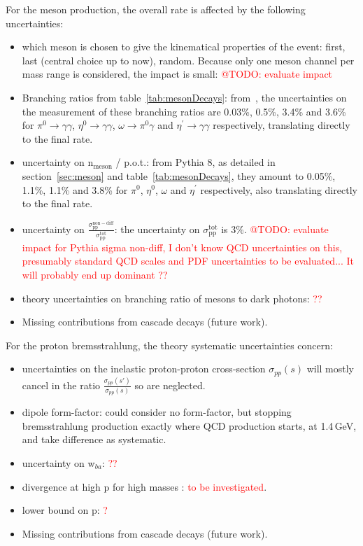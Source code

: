 \documentclass[12pt,a4paper]{article}
\begin{document}
For the meson production, the overall rate is affected by the
following uncertainties:
\begin{itemize}
\item which meson is chosen to give the kinematical properties of the
  event: first, last (central choice up to now), random. Because only
  one meson channel per mass range is considered, the impact is small:
  \textcolor{red}{@TODO: evaluate impact}
\item Branching ratios from table~\ref{tab:mesonDecays}:
  from~\cite{Patrignani:2016xqp}, the uncertainties on the measurement
  of these branching ratios are 0.03\%, 0.5\%, 3.4\% and 3.6\% for
  $\pi^0\rightarrow\gamma\gamma$, $\eta^0\rightarrow \gamma\gamma$,
  $\omega\rightarrow \pi^{0}\gamma$ and $\eta^{\prime}\rightarrow
  \gamma\gamma$ respectively, translating directly to the final rate.
\item uncertainty on n$_{\mathrm{meson}}$ / p.o.t.: from Pythia 8, as
  detailed in section~\ref{sec:meson} and table~\ref{tab:mesonDecays},
  they amount to 0.05\%, 1.1\%, 1.1\% and 3.8\% for $\pi^0$, $\eta^0$,
  $\omega$ and $\eta^{\prime}$ respectively, also translating directly
  to the final rate.
\item uncertainty on
  $\frac{\sigma_{\mathrm{pp}}^{\mathrm{non-diff}}}{\sigma_{\mathrm{pp}}^{\mathrm{tot}}}$:
  the uncertainty on $\sigma_{\mathrm{pp}}^{\mathrm{tot}}$ is
  3\%. \textcolor{red}{@TODO: evaluate impact for Pythia sigma
    non-diff, I don't know QCD uncertainties on this, presumably
    standard QCD scales and PDF uncertainties to be evaluated... It
    will probably end up dominant ?? }
\item theory uncertainties on branching ratio of mesons to dark
  photons: \textcolor{red}{??}
\item Missing contributions from cascade decays (future work).
\end{itemize}

For the proton bremsstrahlung, the theory systematic uncertainties concern:
\begin{itemize}
\item uncertainties on the inelastic proton-proton cross-section
  $\sigma_{pp}(s)$ will mostly cancel in the ratio
  $\frac{\sigma_{pp}(s')}{\sigma_{pp}(s)}$ so are neglected.
\item dipole form-factor: could consider no form-factor, but stopping
  bremsstrahlung production exactly where QCD production starts, at
  1.4\,GeV, and take difference as systematic.
\item uncertainty on w$_{ba}$: \textcolor{red}{??}
\item divergence at high p for high masses : \textcolor{red}{to be investigated}.
\item lower bound on p: \textcolor{red}{?}
\item Missing contributions from cascade decays (future work).
\end{itemize}
\end{document}
